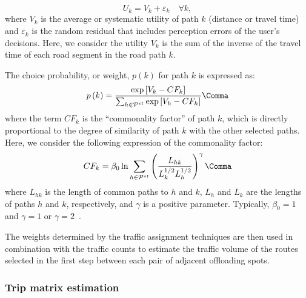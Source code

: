 \begin{equation}
U_k = V_k + \varepsilon_k\quad \forall k,
\end{equation}
where $V_k$ is the average or systematic utility of path $k$ (\eg distance or travel time) and $\varepsilon_k$ is the random residual that includes perception errors of the user’s decisions. Here, we consider the utility $V_k$ is the sum of the inverse of the travel time of each road segment in the road path $k$.

The choice probability, or weight, $p(k)$ for path $k$ is expressed as:
\begin{equation}
p\left(k\right)=\frac{\exp\left[V_{k}-CF_{k}\right]}{\sum_{h\in\mathcal{{P}}^{st}}\exp\left[V_{h}-CF_{h}\right]}\Comma
\end{equation}
where the term $CF_{k}$ is the ``commonality factor'' of path $k$, which is directly proportional to the degree of similarity of path $k$ with the other selected paths. Here, we consider the following expression of the commonality factor:
\begin{equation}
CF_{k}=\beta_{0}\ln\sum_{h\in\mathcal{P}^{st}}\left(\frac{L_{hk}}{L_{k}^{1/2}L_{h}^{1/2}}\right)^{\gamma}\Comma
\end{equation}
where $L_{hk}$ is the length of common paths to $h$ and $k$, $L_{h}$ and $L_{k}$ are the lengths of paths $h$ and $k$, respectively, and $\gamma$ is a positive parameter. Typically, $\beta_{0} = 1$ and $\gamma = 1$ or $\gamma = 2$~\cite{cascetta1996modified}.

The weights determined by the traffic assignment techniques are then used in combination with the traffic counts to estimate the traffic volume of the routes selected in the first step between each pair of adjacent offloading spots. 


\subsubsection{Trip matrix estimation}
\label{sec:trip-matrix-estimation}

